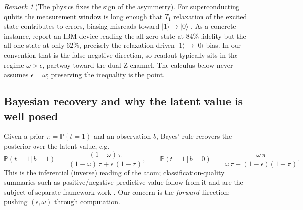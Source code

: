 \documentclass[11pt]{article}
\numberwithin{equation}{section}
\theoremstyle{plain}
\theoremstyle{definition}
\theoremstyle{remark}
\newtheorem{remark}[theorem]{Remark}
\newcommand{\eps}{\epsilon}
\newcommand{\Prob}{\mathbb{P}}
\newcommand{\given}{\,\vert\,}
\newcommand{\ket}[1]{\lvert #1 \rangle}
\begin{document}
\begin{remark}[The physics fixes the sign of the asymmetry]
\label{rem:t1}
For superconducting qubits the measurement window is long enough that $T_1$
relaxation of the excited state contributes to errors, biasing misreads toward
$\ket{1}\!\to\!\ket{0}$ \citep{tannu2019mitigating,hicks2021readout}. As a
concrete instance, \citet{tannu2019mitigating} report an IBM device reading the
all-zero state at $84\%$ fidelity but the all-one state at only $62\%$, precisely
the relaxation-driven $\ket{1}\!\to\!\ket{0}$ bias. In our
convention that is the false-negative direction, so readout typically sits in the
regime $\omega > \eps$, partway toward the dual Z-channel. The calculus below
never assumes $\eps=\omega$; preserving the inequality is the point.
\end{remark}

\subsection{Bayesian recovery and why the latent value is well posed}

Given a prior $\pi=\Prob(t=1)$ and an observation $b$, Bayes' rule recovers the
posterior over the latent value, e.g.
\begin{equation}
\label{eq:bayes}
  \Prob(t=1\given b=1) \;=\;
  \frac{(1-\omega)\,\pi}{(1-\omega)\,\pi + \eps\,(1-\pi)},
  \qquad
  \Prob(t=1\given b=0) \;=\;
  \frac{\omega\,\pi}{\omega\,\pi + (1-\eps)(1-\pi)} .
\end{equation}
This is the inferential (inverse) reading of the atom; classification-quality
summaries such as positive/negative predictive value follow from it and are the
subject of separate framework work \citep{bernoulliMeasures}. Our concern is the
\emph{forward} direction: pushing $(\eps,\omega)$ through computation.
\end{document}
